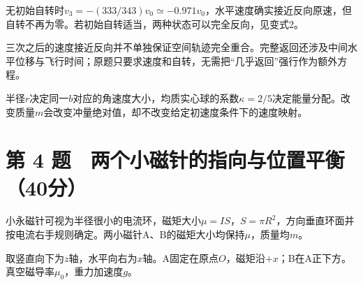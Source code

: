 \documentclass[12pt,a4paper,fontset=fandol]{ctexart}
\begin{document}
无初始自转时\(v_3=-(333/343)v_0\simeq-0.971v_0\)，水平速度确实接近反向原速，但自转不再为零。若初始自转适当，两种状态可以完全反向，见变式2。

三次之后的速度接近反向并不单独保证空间轨迹完全重合。完整返回还涉及中间水平位移与飞行时间；原题只要求速度和自转，无需把``几乎返回''强行作为额外方程。

半径\(r\)决定同一\(b\)对应的角速度大小，均质实心球的系数\(\kappa=2/5\)决定能量分配。改变质量\(m\)会改变冲量绝对值，却不改变给定初速度条件下的速度映射。

\clearpage

\section{第 4
题　两个小磁针的指向与位置平衡（40分）}\label{ux7b2c-4-ux9898-ux4e24ux4e2aux5c0fux78c1ux9488ux7684ux6307ux5411ux4e0eux4f4dux7f6eux5e73ux886140ux5206}

小永磁针可视为半径很小的电流环，磁矩大小\(\mu=IS\)，\(S=\pi R^2\)，方向垂直环面并按电流右手规则确定。两小磁针A、B的磁矩大小均保持\(\mu\)，质量均\(m\)。

取竖直向下为\(z\)轴，水平向右为\(x\)轴。A固定在原点\(O\)，磁矩沿\(+x\)；B在A正下方。真空磁导率\(\mu_0\)，重力加速度\(g\)。

\begin{center}
\begin{minipage}{\linewidth}
\centering\begingroup{}
\ifdim\wd\diagrambox>.88\linewidth
\sbox{\diagrambox}{\resizebox{.88\linewidth}{!}{\usebox{\diagrambox}}}\fi
\ifdim\ht\diagrambox>.38\textheight
\resizebox{!}{.38\textheight}{\usebox{\diagrambox}}
\else\usebox{\diagrambox}\fi
\par{}\endgroup\end{minipage}\end{center}
\end{document}
